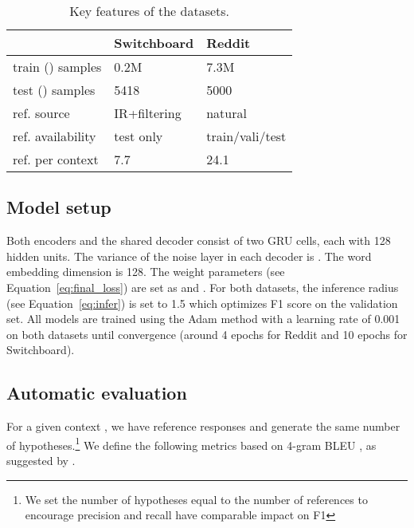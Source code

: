 \documentclass[11pt,a4paper]{article}
\begin{document}
\begin{table}[t]
    \centering
    \small
    \begin{tabular}{p{}|p{}p{}} \hline 
    
                 &  Switchboard    & Reddit \\ \hline
    train () samples & 0.2M          & 7.3M \\
    test () samples & 5418 & 5000\\ \hline
    ref. source & IR+filtering  & natural \\
    ref. availability & test only  & train/vali/test \\
    ref. per context  & 7.7 & 24.1\\ \hline
    \end{tabular}
    \caption{Key features of the datasets.}
    \label{table:dataset}
\end{table}
\subsection{Model setup}
Both encoders and the shared decoder consist of two GRU cells, each with 128 hidden units. The variance of the noise layer in each decoder is .
The word embedding dimension is 128. The weight parameters 
(see Equation~\ref{eq:final_loss}) are set as  and . For both datasets, the inference radius  (see Equation~\ref{eq:infer}) is set to 1.5 which optimizes F1 score on the validation set.
All models are trained using the Adam method \cite{kingma2014adam} with a learning rate of 0.001 on both datasets until convergence (around 4 epochs for Reddit and 10 epochs for Switchboard).

\subsection{Automatic evaluation}
For a given context , we have  reference responses and generate the same number of hypotheses.\footnote{We set the number of hypotheses equal to the number of references to encourage precision and recall have comparable impact on F1} We define the following metrics based on 4-gram BLEU \cite{papineni2002bleu}, as suggested by \citet{zhao2017cvae}.
\end{document}
